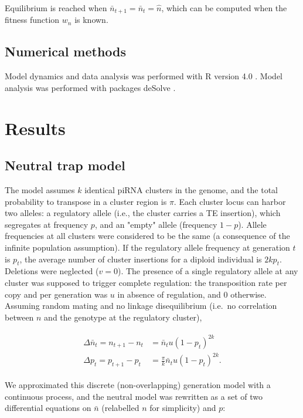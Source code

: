 \documentclass[10pt,a4paper]{article}
\begin{document}
Equilibrium is reached when $\bar n_{t+1} = \bar n_t = \hat n$, which can be computed when the fitness function $w_n$ is known. 

\subsection{Numerical methods}

Model dynamics and data analysis was performed with R version 4.0 \citep{R20}. Model analysis was performed with packages deSolve \citep{SPS10}. 


\section{Results}

\subsection{Neutral trap model} 

The model assumes $k$ identical piRNA clusters in the genome, and the total probability to transpose in a cluster region is $\pi$. Each cluster locus can harbor two alleles: a regulatory allele (i.e., the cluster carries a TE insertion), which segregates at frequency $p$, and an "empty" allele (frequency $1-p$). Allele frequencies at all clusters were considered to be the same (a consequence of the infinite population assumption). If the regulatory allele frequency at generation $t$ is $p_t$, the average number of cluster insertions for a diploid individual is $2kp_t$. Deletions were neglected ($v=0$). The presence of a single regulatory allele at any cluster was supposed to trigger complete regulation: the transposition rate per copy and per generation was $u$ in absence of regulation, and $0$ otherwise. Assuming random mating and no linkage disequilibrium (i.e.\ no correlation between $n$ and the genotype at the regulatory cluster),

\begin{align}\label{eq:basic}
\begin{split}
\Delta \bar n_t = n_{t+1} - n_t &= \bar n_t u (1-p_t)^{2k} \\
\Delta p_t = p_{t+1} - p_t &= \frac{\pi}{k}  \bar n_t u (1-p_t)^{2k}.
\end{split}
\end{align}

We approximated this discrete (non-overlapping) generation model with a continuous process, and the neutral model was rewritten as a set of two differential equations on $\bar n$ (relabelled $n$ for simplicity) and $p$:
\end{document}
